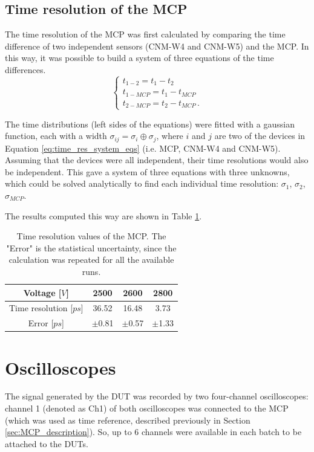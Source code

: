 \subsection{Time resolution of the MCP}
The time resolution of the MCP was first calculated by comparing the time difference of two independent sensors (CNM-W4 and CNM-W5) and the MCP. In this way, it was possible to build a system of three equations of the time differences. 
\begin{equation}\label{eq:time_res_system_eqs}
    \begin{cases}
        t_{1-2} = t_1 - t_2  \\
        t_{1-MCP} = t_1 - t_{MCP} \\
        t_{2-MCP} = t_2 - t_{MCP} \, .
    \end{cases}
\end{equation}

The time distributions (left sides of the equations) were fitted with a gaussian function, each with a width $\sigma_{ij} = \sigma_i \oplus \sigma_j$, where $i$ and $j$ are two of the devices in Equation \ref{eq:time_res_system_eqs} (i.e. MCP, CNM-W4 and CNM-W5). Assuming that the devices were all independent, their time resolutions would also be independent. This gave a system of three equations with three unknowns, which could be solved analytically to find each individual time resolution: $\sigma_1$, $\sigma_2$, $\sigma_{MCP}$.

The results computed this way are shown in Table \ref{tab:MCP_time_resolution}.
\begin{table}[!ht]
    \begin{center}
        \caption{Time resolution values of the MCP. The "Error" is the statistical uncertainty, since the calculation was repeated for all the available runs.}
        \label{tab:MCP_time_resolution}
        \begin{tabular}{ | c | c | c | c | }
            \hline
            Voltage [$\si{V}$] & 2500 & 2600 & 2800 \\ 
            \hline 
            Time resolution [$\si{ps}$] & 36.52 & 16.48 & 3.73 \\  
            Error [$\si{ps}$] & $\pm$0.81 & $\pm$0.57 & $\pm$1.33 \\
            \hline
        \end{tabular}
    \end{center}
\end{table}


\section{Oscilloscopes}
The signal generated by the DUT was recorded by two four-channel oscilloscopes: channel 1 (denoted as Ch1) of both oscilloscopes was connected to the MCP (which was used as time reference, described previously in Section \ref{sec:MCP_description}). So, up to 6 channels were available in each batch to be attached to the DUTs.

